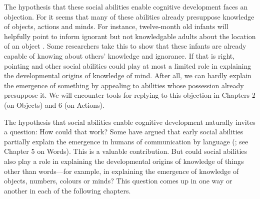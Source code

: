 \documentclass[12pt,\papersize]{extarticle}
\begin{document}
The hypothesis that these social abilities enable cognitive development faces an objection. 
For it seems that many of these abilities already presuppose  knowledge of objects, actions and minds. 
For instance, twelve-month old infants  will helpfully point to inform ignorant but not knowledgable adults about the location of an object  \citep{Liszkowski:2008al}.
Some researchers take this to show that these infants are already capable of knowing about others' knowledge and ignorance. 
If that is right, pointing and other social abilities could play at most a limited role in explaining the developmental origins of knowledge of mind. 
After all, we can hardly explain the emergence of something by appealing to abilities whose possession already presuppose it.
We will encounter tools for replying to this objection in Chapters 2 (on Objects) and 6 (on Actions).

The hypothesis that social abilities enable cognitive development naturally invites a question: How could that work? 
Some have argued that early social abilities partially explain the emergence in humans of communication by language (\citealp{tomasello:2008origins}; see Chapter 5 on Words). 
This is a valuable contribution.  
But could social abilities also play a role in explaining the developmental origins of knowledge of things other than words---for example, in explaining the emergence of knowledge of objects, numbers, colours or minds? 
This question comes up in one way or another in each of the following chapters.
\end{document}
